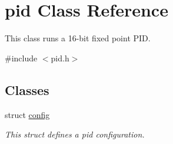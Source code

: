 \hypertarget{classpid}{\section{pid Class Reference}
\label{classpid}
}


This class runs a 16-\/bit fixed point P\-I\-D.  




{\ttfamily \#include $<$pid.\-h$>$}

\subsection*{Classes}
\begin{DoxyCompactItemize}
\item 
struct \hyperlink{structpid_1_1config}{config}
\begin{DoxyCompactList}\small\item\em This struct defines a pid configuration. \end{DoxyCompactList}\end{DoxyCompactItemize}
